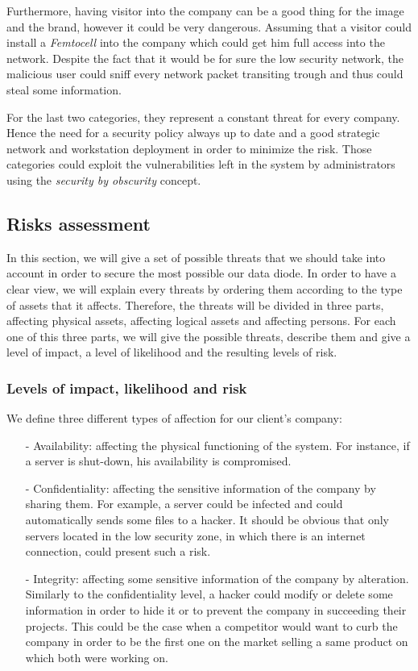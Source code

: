 \documentclass[a4paper,10pt]{article}
\begin{document}
Furthermore, having visitor into the company can be a good thing for the image and the brand, however it could be very dangerous. Assuming that a visitor could install a \emph{Femtocell} into the company which could get him full access into the network. Despite the fact that it would be for sure the low security network, the malicious user could sniff every network packet transiting trough and thus could steal some information.

For the last two categories, they represent a constant threat for every company. Hence the need for a security policy always up to date and a good strategic network and workstation deployment in order to minimize the risk. Those categories could exploit the vulnerabilities left in the system by administrators using the \emph{security by obscurity} concept.

\subsection{Risks assessment}
In this section, we will give a set of possible threats that we should take into account in order to secure the most possible our data diode. In order to have a clear view, we will explain every threats by ordering them according to the type of assets that it affects. Therefore, the threats will be divided in three parts, affecting physical assets, affecting logical assets and affecting persons. For each one of this three parts, we will give the possible threats, describe them and give a level of impact, a level of likelihood and the resulting levels of risk.

\subsubsection{Levels of impact, likelihood and risk}
We define three different types of affection for our client's company:
\begin{enumerate}
\item[-] Availability: affecting the physical functioning of the system. For instance, if a server is shut-down, his availability is compromised.
\item[-] Confidentiality: affecting the sensitive information of the company by sharing them. For example, a server could be infected and could automatically sends some files to a hacker. It should be obvious that only servers located in the low security zone, in which there is an internet connection, could present such a risk.
\item[-] Integrity: affecting some sensitive information of the company by alteration. Similarly to the confidentiality level, a hacker could modify or delete some information in order to hide it or to prevent the company in succeeding their projects. This could be the case when a competitor would want to curb the company in order to be the first one on the market selling a same product on which both were working on.
\end{enumerate}
\end{document}
